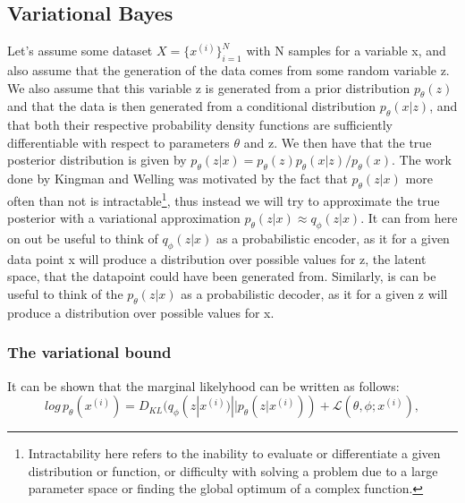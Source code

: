 \subsection*{Variational Bayes}
Let's assume some dataset $X = \{x^{(i)}\}_{i=1}^{N}$ with N samples for a variable x, and also assume that the generation of the data comes from 
some random variable z. We also assume that this variable z is generated from a prior distribution $p_{\theta}(z)$ and that the data is then 
generated from a conditional distribution $p_{\theta}(x|z)$, and that both their respective probability density functions are sufficiently 
differentiable with respect to parameters $\theta$ and z. We then have that the true posterior distribution is given by 
$p_{\theta}(z|x) = p_{\theta}(z)p_{\theta}(x|z)/p_{\theta}(x)$. The work done by Kingman and Welling \cite{VAE} was motivated by the fact that
$p_{\theta}(z|x)$ more often than not is intractable\footnote{Intractability here refers to the inability to evaluate or differentiate 
a given distribution or function, or difficulty with solving a problem due to a large parameter space or finding the global optimum of 
a complex function. }, thus instead we will try to approximate the true posterior with a variational approximation $p_{\theta}(z|x) \approx q_{\phi}(z|x)$.   
It can from here on out be useful to think of $q_{\phi}(z|x)$ as a probabilistic encoder, as it for a given data point x will produce a distribution
over possible values for z, the latent space, that the datapoint could have been generated from. Similarly, is can be useful to think of the   
$p_{\theta}(z|x)$ as a probabilistic decoder, as it for a given z will produce a distribution over possible values for x.

\subsubsection*{The variational bound}
It can be shown that the marginal likelyhood can be written as follows:
\begin{equation}
    log\, p_{\theta}(x^{(i)}) = D_{KL}(q_{\phi}(z|x^{(i)})||p_{\theta}(z|x^{(i)})) + \mathcal{L}(\theta, \phi;x^{(i)}),
\end{equation}

